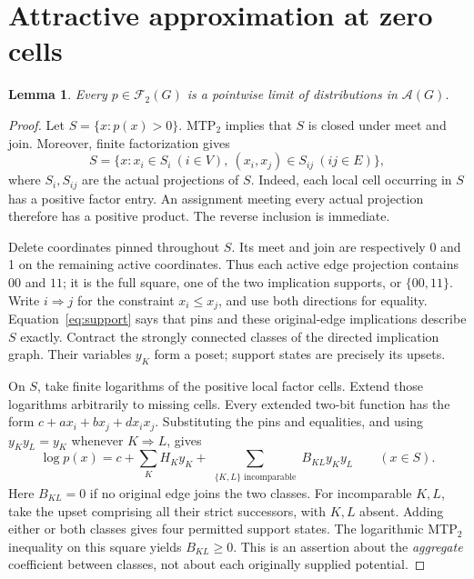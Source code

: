 \documentclass[11pt]{article}
\newtheorem{lemma}[theorem]{Lemma}
\newcommand{\F}{\mathcal F_2(G)}
\newcommand{\A}{\mathcal A(G)}
\begin{document}
\section{Attractive approximation at zero cells}
\begin{lemma}\label{lem:density}
Every $p\in\F$ is a pointwise limit of distributions in $\A$.
\end{lemma}
\begin{proof}
Let $S=\{x:p(x)>0\}$. MTP$_2$ implies that $S$ is closed under meet and join. Moreover, finite factorization gives
\begin{equation}\label{eq:support}
 S=\{x:x_i\in S_i\ (i\in V),\ (x_i,x_j)\in S_{ij}\ (ij\in E)\},
\end{equation}
where $S_i,S_{ij}$ are the actual projections of $S$. Indeed, each local cell occurring in $S$ has a positive factor entry. An assignment meeting every actual projection therefore has a positive product. The reverse inclusion is immediate.

Delete coordinates pinned throughout $S$. Its meet and join are respectively 0 and 1 on the remaining active coordinates. Thus each active edge projection contains $00$ and $11$; it is the full square, one of the two implication supports, or $\{00,11\}$. Write $i\Rightarrow j$ for the constraint $x_i\leq x_j$, and use both directions for equality. Equation~\eqref{eq:support} says that pins and these original-edge implications describe $S$ exactly. Contract the strongly connected classes of the directed implication graph. Their variables $y_K$ form a poset; support states are precisely its upsets.

On $S$, take finite logarithms of the positive local factor cells. Extend those logarithms arbitrarily to missing cells. Every extended two-bit function has the form $c+a x_i+b x_j+d x_ix_j$. Substituting the pins and equalities, and using $y_Ky_L=y_K$ whenever $K\Rightarrow L$, gives
\begin{equation}\label{eq:quotient}
 \log p(x)=c+\sum_K H_K y_K+
 \sum_{\substack{\{K,L\}\text{ incomparable}}} B_{KL}y_Ky_L\qquad(x\in S).
\end{equation}
Here $B_{KL}=0$ if no original edge joins the two classes. For incomparable $K,L$, take the upset comprising all their strict successors, with $K,L$ absent. Adding either or both classes gives four permitted support states. The logarithmic MTP$_2$ inequality on this square yields $B_{KL}\geq0$. This is an assertion about the \emph{aggregate} coefficient between classes, not about each originally supplied potential.


\end{proof}
\end{document}

